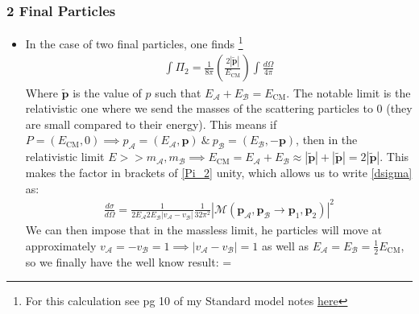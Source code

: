 \documentclass[11pt]{article}
\renewenvironment{flalign}{\vspace{-2mm}\empheq[box=\tcbhighmath]{align}}{\endempheq}
\numberwithin{equation}{section}
\begin{document}
\subsubsection{2 Final Particles} %
\label{ssub:2_final_particles}
\begin{itemize}
    \item In the case of two final particles, one finds \footnote{For this calculation see pg 10 of my Standard model notes \href{https://tbrosnan12.github.io/documents/Fourth_year/Second_semester/Standard_Model.pdf}{here}}
      \begin{align}
      \label{Pi_2}
        \int \Pi_2= \frac{1}{8\pi}\left(\frac{2|\tilde{\textbf{p}}|}{E_{\text{CM}}}\right)\int\frac{d\Omega}{4\pi} 
      \end{align}
      Where $\tilde{\textbf{p}}$ is the value of $p$ such that $ E_{\mathcal{A}}+E_{\mathcal{B}} = E_{\text{CM}}$. The notable limit is the relativistic one where we send the masses of the scattering particles to $0$ (they are small compared to their energy). This means if $P = (E_{\text{CM}},0) \implies p_{\mathcal{A}}=(E_{\mathcal{A}},\textbf{p}) ~\&~ p_{\mathcal{B}}=(E_{\mathcal{B}},-\textbf{p})$, then in the relativistic limit $E>>m_{\mathcal{A}},m_{\mathcal{B}} \implies E_{\text{CM}} = E_{\mathcal{A}}+E_{\mathcal{B}} \approx |\tilde{\textbf{p}}|+|\tilde{\textbf{p}}| =2|\tilde{\textbf{p}}|$. This makes the factor in brackets of \ref{Pi_2} unity, which allows us to write \ref{dsigma} as:
      \begin{align*}
        \frac{d\sigma}{d\Omega} = \frac{1}{2E_{\mathcal{A}}2E_{\mathcal{B}}|v_{\mathcal{A}}-v_{\mathcal{B}}|}\frac{1}{32\pi^2}|\mathcal{M}(\textbf{p}_{\mathcal{A}},\textbf{p}_{\mathcal{B}} \rightarrow \textbf{p}_1,\textbf{p}_2)|^2
      \end{align*}
      We can then impose that in the massless limit, he particles will move at approximately $v_{\mathcal{A}}=-v_{\mathcal{B}}=1 \implies |v_{\mathcal{A}}-v_{\mathcal{B}}| = 1$ as well as $E_{\mathcal{A}}=E_{\mathcal{B}}=\frac{1}{2}E_{\text{CM}}$, so we finally have the well know result:
      \begin{flalign}
      \label{dsigma/domega}
          = 
      \end{flalign}
\end{itemize}
\end{document}
